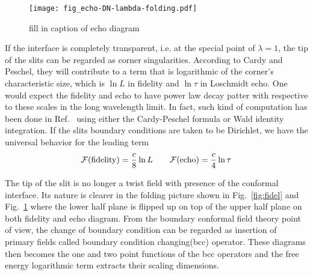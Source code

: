 \begin{figure}[h]
\centering
\texttt{[image: fig\_echo-DN-lambda-folding.pdf]}
\caption{\color{red} fill in caption of echo diagram}
\label{fig:echo}
\end{figure}

If the interface is completely transparent, i.e. at the special point of $\lambda = 1$, the tip of the slits can be regarded as corner singularities. According to Cardy and Peschel\cite{cardy_finite-size_1988}, they will contribute to a term that is logarithmic of the corner's characteristic size, which is $\ln L$ in fidelity and $\ln \tau$ in Loschmidt echo. One would expect the fidelity and echo to have power law decay patter with respective to these scales in the long wavelength limit. In fact, such kind of computation has been done in Ref.~ using either the Cardy-Peschel formula or Wald identity integration. If the slits boundary conditions are taken to be Dirichlet, we have the universal behavior for the leading term \cite{stephan_logarithmic_2013,stephan_local_2011}
\begin{equation}
\label{eq:full-pass}
\mathcal{F}({\rm fidelity}) =  \frac{c}{8} \ln L \qquad \mathcal{F}( {\rm echo} )  = \frac{c}{4} \ln \tau 
\end{equation}

The tip of the slit is no longer a twist field with presence of the conformal interface. Its nature is clearer in the folding picture shown in Fig.~\ref{fig:fidel} and Fig.~\ref{fig:echo} where the lower half plane is flipped up on top of the upper half plane on both fidelity and echo diagram. From the boundary conformal field theory point of view, the change of boundary condition can be regarded as insertion of primary fields called boundary condition changing(bcc) operator. These diagrams then becomes the one and two point functions of the bcc operators and the free energy logarithmic term extracts their scaling dimensions. 




